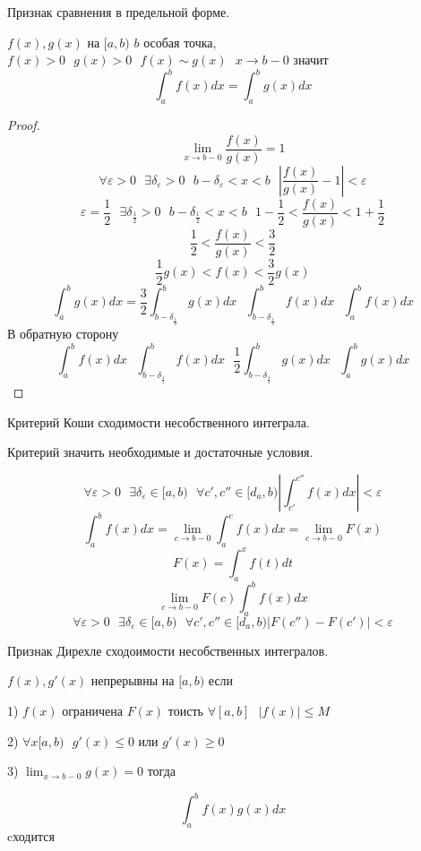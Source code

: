 \begin{title}[\Large]
  Признак сравнения в предельной форме.
\end{title}

\begin{theorem}
  $f(x), g(x)$ на $[a, b)$ $b$ особая точка, $f(x) > 0 ~~~ g(x) > 0 ~~~
  f(x) \sim g(x) ~~~ x \to b -0$ значит
  $$
  \int_a^b f(x)dx = \int_a^b g(x)dx
  $$
\end{theorem}

\begin{proof}
  $$
  \lim_{x \to b-0} \frac{f(x)}{g(x)} = 1
  $$
  $$
  \forall \varepsilon > 0 ~~~ \exists \delta_{\varepsilon} > 0 ~~~
  b - \delta_{\varepsilon} < x < b ~~~ \left| \frac{f(x)}{g(x)} - 1 \right|
  < \varepsilon
  $$
  $$
  \varepsilon = \frac{1}{2} ~~~ \exists \delta_{\frac{1}{2}} > 0 ~~~
  b - \delta_{\frac{1}{2}} < x < b ~~~
  1 - \frac{1}{2} < \frac{f(x)}{g(x)} < 1 + \frac{1}{2}
  $$
  $$
  \frac{1}{2} < \frac{f(x)}{g(x)} < \frac{3}{2}
  $$
  $$
  \frac{1}{2} g(x) < f(x) < \frac{3}{2} g(x)
  $$
  $$
  \int_a^b g(x)dx = \frac{3}{2} \int_{b - \delta_{\frac{1}{2}}}^b g(x)dx ~~~
  \int_{b - \delta_{\frac{1}{2}}}^b f(x)dx ~~~
  \int_a^b f(x)dx
  $$
  В обратную сторону
  $$
  \int_a^b f(x)dx ~~~
  \int_{b - \delta_{\frac{1}{2}}}^b f(x)dx ~~~
  \frac{1}{2} \int_{b - \delta_{\frac{1}{2}}}^b g(x)dx ~~~
  \int_a^b g(x)dx
  $$
\end{proof}

\begin{title}[\Large]
  Критерий Коши сходимости несобственного интеграла.
\end{title}
Критерий значить необходимые и достаточные условия.

$$
\forall \varepsilon > 0 ~~~ \exists \delta_{\varepsilon} \in [a,b) ~~~
\forall c', c'' \in [d_a, b) \left| \int_{c'}^{c''} f(x)dx \right| < \varepsilon
$$
$$
\int_a^b f(x)dx = \lim_{c \to b-0} \int_a^c f(x)dx = \lim_{c \to b-0} F(x)
$$
$$
F(x) = \int_a^x f(t)dt
$$
$$
\lim_{c \to b-0} F(c) \int_a^b f(x)dx
$$
$$
\forall \varepsilon > 0 ~~~ \exists \delta_{\varepsilon} \in [a,b) ~~~
\forall c', c'' \in [d_a, b) |F(c'') - F(c')| < \varepsilon
$$

\begin{title}[\Large]
  Признак Дирехле сходоимости несобственных интегралов.
\end{title}

\begin{theorem}
  $f(x), g'(x)$ непрерывны на $[a,b)$ если

  1) $f(x)$ ограничена $F(x)$ тоисть $\forall [a,b] ~~~ |f(x)| \le M$

  2) $\forall x[a,b) ~~~ g'(x) \le 0$ или $g'(x) \ge 0$

  3) $\lim_{x \to b-0} g(x) = 0$ тогда

  $$\int_a^b f(x)g(x)dx$$ cходится
\end{theorem}

